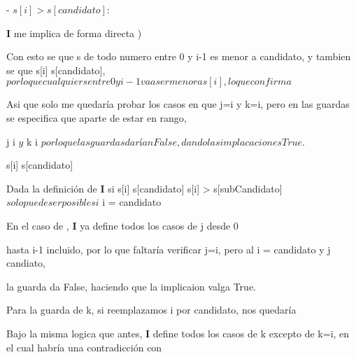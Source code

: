 \documentclass[10pt,a4paper]{article}
\begin{document}
  \vspace{5mm}

 - $s[i] > s[candidato]$:

  \vspace{5mm}

\textbf{I} me implica de forma directa )

Con esto se que s de todo numero entre 0 y i-1 es menor a  candidato, y tambien se que s[i] \geq s[candidato],$ por lo que 

cualquier s entre 0 y i-1 va a ser menor a s[i], lo que
confirma $

Asi que solo me quedaría probar los casos en que j=i y k=i, pero en las guardas se especifica que aparte de estar en rango, 

j \neq i $ y $ k \neq i $ por lo que las guardas darían False, dando las implacaciones True.$

  \vspace{5mm}

 s[i] \leq s[candidato]

  \vspace{5mm}

Dada la definición de \textbf{I} si s[i] \leq s[candidato] \wedge s[i] > s[subCandidato] $ solo puede ser posible si $ i = candidato

\vspace{5mm}

En el caso de , \textbf{I} ya define todos los casos de j desde 0 

hasta i-1 incluido, por lo que faltaría verificar j=i, pero al i = candidato y j \neq candiato, 

la guarda da False, haciendo que la implicaion valga True.


  \vspace{5mm}

Para la guarda de k, si reemplazamos i por candidato, nos quedaría 


Bajo la misma logica que antes, \textbf{I} define todos los casos de k excepto de k=i, en el cual habría una contradicción con
\end{document}
